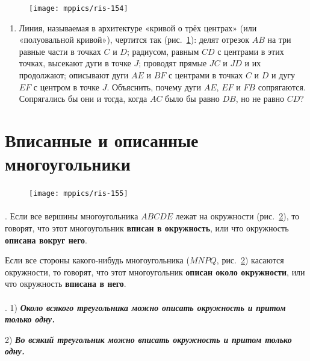 \documentclass[oneside]{book}
\begin{document}
\begin{figure}[h!]
\centering
\texttt{[image: mppics/ris-154]}
\caption{}\label{1938/ris-154}
\end{figure}

\begin{enumerate}[resume]

\item
Линия, называемая в архитектуре «кривой о трёх центрах» (или «полуовальной кривой»), чертится так (рис.~\ref{1938/ris-154}):
делят отрезок $AB$ на три равные части в точках $C$ и $D$;
радиусом, равным $CD$ с центрами в этих точках, высекают дуги в точке $J$;
проводят прямые $JC$ и $JD$ и их продолжают;
описывают дуги $AE$ и $BF$ с центрами в точках $C$ и $D$ и дугу $EF$ с центром в точке $J$.
Объяснить, почему дуги $AE$, $EF$ и $FB$ сопрягаются.
Сопрягались бы они и тогда, когда $AC$ было бы равно $DB$, но не равно $CD$?

\end{enumerate}


\section{Вписанные и описанные многоугольники}

\begin{figure}
\centering
\texttt{[image: mppics/ris-155]}
\caption{}\label{1938/ris-155}
\end{figure}

\paragraph{}\label{1938/136}
\mbox{.}
Если все вершины многоугольника $ABCDE$ лежат на окружности (рис.~\ref{1938/ris-155}), то говорят, что этот многоугольник \textbf{вписан в окружность}, или что окружность \textbf{описана вокруг него}.

Если все стороны какого-нибудь многоугольника ($MNPQ$, рис.~\ref{1938/ris-155}) касаются окружности, то говорят, что этот многоугольник \textbf{описан около окружности}, или что окружность \textbf{вписана в него}.

\paragraph{}\label{1938/137}
.
1) \textbf{\emph{Около всякого треугольника можно описать окружность и притом только одну.}}

2) \textbf{\emph{Во всякий треугольник можно вписать окружность и притом только одну.}}
\end{document}

